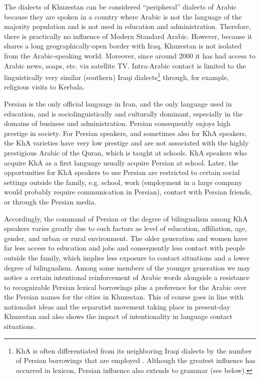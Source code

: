 \documentclass[output=paper,nonflat]{langsci/langscibook}
\begin{document}
The dialects of Khuzestan can be considered “peripheral” dialects of Arabic because they are spoken in a country where Arabic is not the language of the majority population and is not used in education and administration. Therefore, there is practically no influence of Modern Standard Arabic. However, because it shares a long geographically-open border with Iraq, Khuzestan is not isolated from the Arabic-speaking world. Moreover, since around 2000 it has had access to Arabic news, soaps, etc. via satellite TV. Intra-Arabic contact is limited to the linguistically very similar (southern) Iraqi dialects\footnote{KhA is often differentiated from its neighboring Iraqi dialects by the number of Persian borrowings that are employed \citep[1020]{Gazsi2011}. Although the greatest influence has occurred in lexicon, Persian influence also extends to grammar (see below).} through, for example, religious visits to Kerbala.

Persian is the only official language in Iran, and the only language used in education, and is sociolinguistically and culturally dominant, especially in the domains of business and administration. Persian consequently enjoys high prestige in society. For Persian speakers, and sometimes also for KhA speakers, the KhA varieties have very low prestige and are not associated with the highly prestigious Arabic of the Quran, which is taught at schools. KhA speakers who acquire KhA as a first language usually acquire Persian at school. Later, the opportunities for KhA speakers to use Persian are restricted to certain social settings outside the family, e.g. school, work (employment in a large company would probably require communication in Persian), contact with Persian friends, or through the Persian media.

Accordingly, the command of Persian or the degree of bilingualism among KhA speakers varies greatly due to such factors as level of education, affiliation, age, gender, and urban or rural environment. The older generation and women have far less access to education and jobs and consequently less contact with people outside the family, which implies less exposure to contact situations and a lower degree of bilingualism. Among some members of the younger generation we may notice a certain intentional reinforcement of Arabic words alongside a resistance to recognizable Persian lexical borrowings plus a preference for the Arabic over the Persian names for the cities in Khuzestan. This of course goes in line with nationalist ideas and the separatist movement taking place in present-day Khuzestan and also shows the impact of intentionality in language contact situations. 
\end{document}
